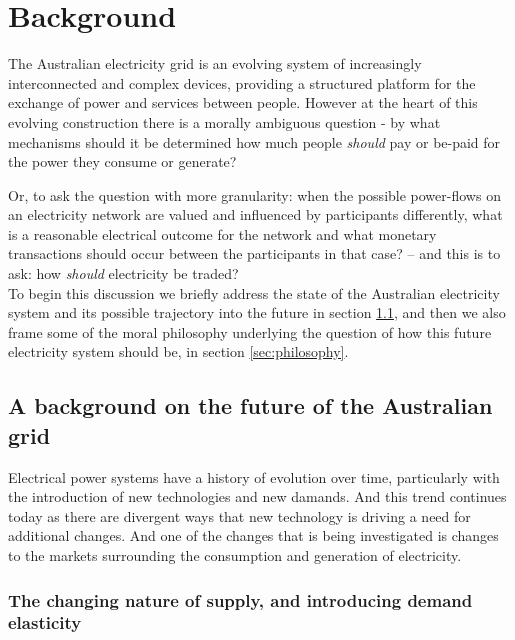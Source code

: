 \chapter{Background}
\label{cha:background}

The Australian electricity grid is an evolving system of increasingly interconnected and complex devices, providing a structured platform for the exchange of power and services between people.
However at the heart of this evolving construction there is a morally ambiguous question - by what mechanisms should it be determined how much people \textit{should} pay or be-paid for the power they consume or generate?

Or, to ask the question with more granularity: when the possible power-flows on an electricity network are valued and influenced by participants differently, 
what is a reasonable electrical outcome for the network and what monetary transactions should occur between the participants in that case? -- and this is to ask: how \textit{should} electricity be traded?\\

To begin this discussion we briefly address the state of the Australian electricity system and its possible trajectory into the future in section \ref{sec:electricity_system},
and then we also frame some of the moral philosophy underlying the question of how this future electricity system should be, in section \ref{sec:philosophy}.

\section{A background on the future of the Australian grid}\label{sec:electricity_system}

Electrical power systems have a history of evolution over time, particularly with the introduction of new technologies and new damands.
And this trend continues today as there are divergent ways that new technology is driving a need for additional changes.
And one of the changes that is being investigated is changes to the markets surrounding the consumption and generation of electricity.

\subsection{The changing nature of supply, and introducing demand elasticity}

